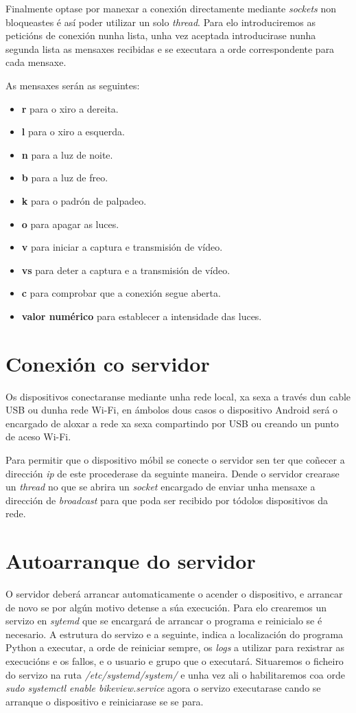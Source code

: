  Finalmente optase por manexar a conexión directamente mediante \emph{sockets} non bloqueastes é así poder utilizar un solo \emph{thread}. Para elo introduciremos as peticións de conexión nunha lista, unha vez aceptada introducirase nunha segunda lista as mensaxes recibidas e se executara a orde correspondente para cada mensaxe.

As mensaxes serán as seguintes:
\begin{itemize}
    \item \textbf{r} para o xiro a dereita.
    \item \textbf{l} para o xiro a esquerda.
    \item \textbf{n} para a luz de noite.
    \item \textbf{b} para a luz de freo.
    \item \textbf{k} para o padrón de palpadeo.
    \item \textbf{o} para apagar as luces.
    \item \textbf{v} para iniciar a captura e transmisión de vídeo.
    \item \textbf{vs} para deter a captura e a transmisión de vídeo.
    \item \textbf{c} para comprobar que a conexión segue aberta.
    \item \textbf{valor numérico} para establecer a intensidade das luces.
\end{itemize}

\section{Conexión co servidor}
Os dispositivos conectaranse mediante unha rede local, xa sexa a través dun cable USB ou dunha rede Wi-Fi, en ámbolos dous casos o dispositivo Android será o encargado de aloxar a rede xa sexa compartindo por USB ou creando un punto de aceso Wi-Fi.

Para permitir que o dispositivo móbil se conecte o servidor sen ter que coñecer a dirección \emph{ip} de este procederase da seguinte maneira. Dende o servidor crearase un \emph{thread} no que se abrira un \emph{socket} encargado de enviar unha mensaxe a dirección de \emph{broadcast} para que poda ser recibido por tódolos dispositivos da rede.

\section{Autoarranque do servidor}
O servidor deberá arrancar automaticamente o acender o dispositivo, e arrancar de novo se por algún motivo detense a súa execución. Para elo crearemos un servizo en \emph{sytemd} que se encargará de arrancar o programa e reinicialo se é necesario. A estrutura do servizo e a seguinte, indica a localización do programa Python a executar, a orde de reiniciar sempre, os \emph{logs} a utilizar para rexistrar as execucións e os fallos, e o usuario e grupo que o executará. Situaremos o ficheiro do servizo na ruta \textit{/etc/systemd/system/} e unha vez ali o habilitaremos coa orde \textit{sudo systemctl enable bikeview.service} agora o servizo executarase cando se arranque o dispositivo e reiniciarase se se para.


